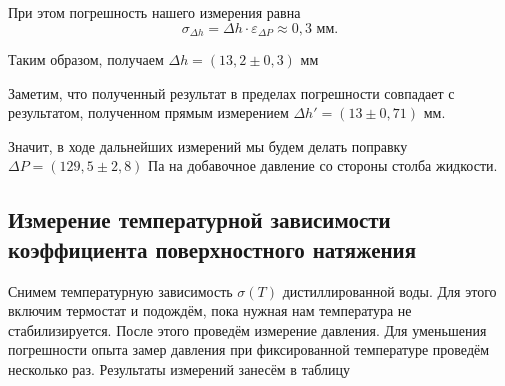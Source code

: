 \documentclass[a4paper,12pt]{article}
\begin{document}
\medskip

При этом погрешность нашего измерения равна \[ \sigma_{\Delta h} = \Delta h \cdot \varepsilon_{\Delta P} \approx 0,3 \text{ мм}. \]

Таким образом, получаем $\Delta h = (13,2 \pm 0,3) \text{ мм} $

\medskip

Заметим, что полученный результат в пределах погрешности совпадает с результатом, полученном прямым измерением $\Delta h' = (13 \pm 0,71) \text{ мм}. $

Значит, в ходе дальнейших измерений мы будем делать поправку $ \Delta P = (129,5 \pm 2,8) \text{ Па} $ на добавочное давление со стороны столба жидкости.



\subsection*{Измерение температурной зависимости коэффициента поверхностного натяжения}

Снимем температурную зависимость $ \sigma(T) $ дистиллированной воды. Для этого включим термостат и подождём, пока нужная нам температура не стабилизируется. После этого проведём измерение давления. Для уменьшения погрешности опыта замер давления  при фиксированной температуре проведём несколько раз. Результаты измерений занесём в таблицу
\end{document}
